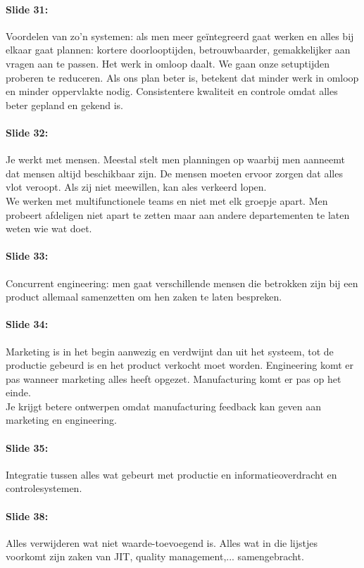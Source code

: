 \documentclass[10pt,a4paper]{report}
\begin{document}
\paragraph{Slide 31:} Voordelen van zo'n systemen: als men meer ge\"integreerd gaat werken en alles bij elkaar gaat plannen: kortere doorlooptijden, betrouwbaarder, gemakkelijker aan vragen aan te passen. Het werk in omloop daalt. We gaan onze setuptijden proberen te reduceren. Als ons plan beter is, betekent dat minder werk in omloop en minder oppervlakte nodig. Consistentere kwaliteit en controle omdat alles beter gepland en gekend is.

\paragraph{Slide 32:} Je werkt met mensen. Meestal stelt men planningen op waarbij men aanneemt dat mensen altijd beschikbaar zijn. De mensen moeten ervoor zorgen dat alles vlot veroopt. Als zij niet meewillen, kan ales verkeerd lopen.\\
We werken met multifunctionele teams en niet met elk groepje apart. 
Men probeert afdeligen niet apart te zetten maar aan andere departementen te laten weten wie wat doet.

\paragraph{Slide 33:} Concurrent engineering: men gaat verschillende mensen die betrokken zijn bij een product allemaal samenzetten om hen zaken te laten bespreken. 

\paragraph{Slide 34:} Marketing is in het begin aanwezig en verdwijnt dan uit het systeem, tot de productie gebeurd is en het product verkocht moet worden. Engineering komt er pas wanneer marketing alles heeft opgezet. Manufacturing komt er pas op het einde.\\
Je krijgt betere ontwerpen omdat manufacturing feedback kan geven aan marketing en engineering. 

\paragraph{Slide 35:} Integratie tussen alles wat gebeurt met productie en informatieoverdracht en controlesystemen.

\paragraph{Slide 38:} Alles verwijderen wat niet waarde-toevoegend is.
Alles wat in die lijstjes voorkomt zijn zaken van JIT, quality management,... samengebracht.
\end{document}
